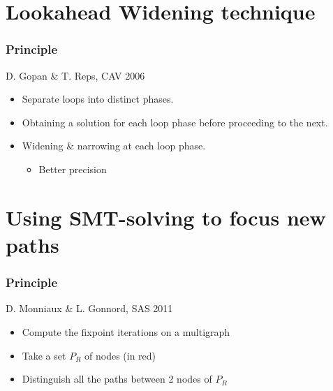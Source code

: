 \documentclass{beamer}
\begin{document}
\begin{frame}
\begin{columns}
\begin{column}{5cm}
\end{column}
\end{columns}
\end{frame}


\section[Lookahead Widening]{Lookahead Widening technique}

\begin{frame}
  \frametitle{Principle}

D. Gopan \& T. Reps, CAV 2006
\bigskip
\begin{itemize}
\item Separate loops into distinct phases.
\item Obtaining a solution for each loop phase before proceeding to the next.
\item Widening \& narrowing at each loop phase.
\begin{itemize}
\item Better precision
\end{itemize}
\end{itemize}
\end{frame}

\section[Path focusing]{Using SMT-solving to focus new paths}

\begin{frame}
  \frametitle{Principle}

D. Monniaux \& L. Gonnord, SAS 2011
\bigskip
\begin{itemize}
\item Compute the fixpoint iterations on a multigraph
\item Take a set $P_R$ of nodes (in red)
\item Distinguish all the paths between 2 nodes of $P_R$
\end{itemize}
\end{frame}
\end{document}
